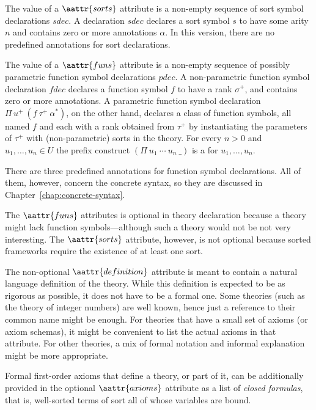 The value of a $\aattr{sorts}$ attribute is a non-empty sequence
of sort symbol declarations $\mathit{sdec}$.
A declaration $\mathit{sdec}$ declares 
a sort symbol $s$ to have some arity $n$ and 
contains zero or more annotations $\alpha$.
In this version, there are no predefined annotations for sort declarations.

The value of a $\aattr{funs}$ attribute is a non-empty sequence
of possibly parametric function symbol declarations $\mathit{pdec}$.
A non-parametric function symbol declaration $\mathit{fdec}$ 
declares a function symbol $f$ to have a rank $\sigma^+$,
and contains zero or more annotations.
A parametric function symbol declaration $\Pi\, u^+\: (f\: \tau^+\: \alpha^*)$,
on the other hand,
declares a class of function symbols, 
all named $f$ and each with a rank obtained from $\tau^+$ 
by instantiating the parameters of $\tau^+$ with (non-parametric) sorts
in the theory.
For every $n > 0$ and $u_1, \ldots, u_n \in \mathit{U}$
the prefix construct $(\Pi\:u_1\:\cdots\:u_n\ \_)$ is 
a 
for $u_1, \ldots, u_n$.

There are three predefined annotations for function symbol declarations.
All of them, however, concern the concrete syntax,
so they are discussed in Chapter~\ref{chap:concrete-syntax}.

The $\aattr{funs}$ attributes is optional in theory declaration
because a theory might lack function symbols---although 
such a theory would not be not very interesting.
The $\aattr{sorts}$ attribute, however, is not optional
because sorted frameworks require the existence of at least one sort.

The non-optional $\aattr{definition}$ attribute is meant to contain
a natural language definition of the theory.
While this definition is expected to be as rigorous as possible,
it does not have to be a formal one.
Some theories (such as the theory of integer numbers) are well known,
hence just a reference to their common name might be enough.
For theories that have a small set of axioms (or axiom schemas),
it might be convenient to list the actual axioms in that attribute.
For other theories, 
a mix of formal notation and informal explanation might be more appropriate.
  
Formal first-order axioms 
that define a theory, or part of it, can be additionally
provided in the optional $\aattr{axioms}$ attribute 
as a list of \emph{closed formulas},
that is, well-sorted terms of sort  all of whose variables are bound.


